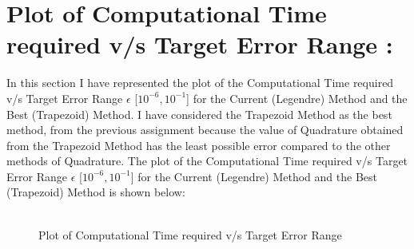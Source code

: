 \documentclass[12pt,a4paper]{article}
\begin{document}
\section{Plot of  Computational Time required v/s Target Error Range :}
In this section I have represented the plot of the Computational Time required v/s Target Error Range $\epsilon$ [$10^{-6}, 10^{-1}$] for the Current (Legendre) Method and the Best (Trapezoid) Method. I have considered the Trapezoid Method as the best method, from the previous assignment because the value of Quadrature obtained from the Trapezoid Method has the least possible error compared to the other methods of Quadrature. The plot of the Computational Time required v/s Target Error Range $\epsilon$ [$10^{-6}, 10^{-1}$] for the Current (Legendre) Method and the Best (Trapezoid) Method is shown below:
\\ \\
\begin{figure}[!ht]
	\begin{center}
	\end{center}
	\caption{Plot of Computational Time required v/s Target Error Range}
\end{figure}
\end{document}
